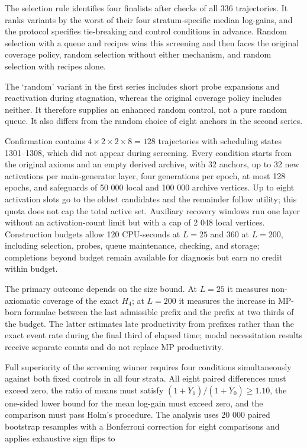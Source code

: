 \documentclass[pdflatex,sn-basic,Numbered]{sn-jnl}
\begin{document}
The selection rule identifies four finalists after checks of all 336 trajectories. It ranks variants by the worst of their four stratum-specific median log-gains, and the protocol specifies tie-breaking and control conditions in advance. Random selection with a queue and recipes wins this screening and then faces the original coverage policy, random selection without either mechanism, and random selection with recipes alone.

The `random' variant in the first series includes short probe expansions and reactivation during stagnation, whereas the original coverage policy includes neither. It therefore supplies an enhanced random control, not a pure random queue. It also differs from the random choice of eight anchors in the second series.

Confirmation contains \(4 \times 2 \times 2 \times 8 = 128\) trajectories with scheduling states 1301--1308, which did not appear during screening. Every condition starts from the original axioms and an empty derived archive, with 32 anchors, up to 32 new activations per main-generator layer, four generations per epoch, at most 128 epochs, and safeguards of 50 000 local and 100 000 archive vertices. Up to eight activation slots go to the oldest candidates and the remainder follow utility; this quota does not cap the total active set. Auxiliary recovery windows run one layer without an activation-count limit but with a cap of 2 048 local vertices. Construction budgets allow 120 CPU-seconds at \(L = 25\) and 360 at \(L = 200\), including selection, probes, queue maintenance, checking, and storage; completions beyond budget remain available for diagnosis but earn no credit within budget.

The primary outcome depends on the size bound. At \(L = 25\) it measures non-axiomatic coverage of the exact \(H_{4}\); at \(L = 200\) it measures the increase in MP-born formulae between the last admissible prefix and the prefix at two thirds of the budget. The latter estimates late productivity from prefixes rather than the exact event rate during the final third of elapsed time; modal necessitation results receive separate counts and do not replace MP productivity.

Full superiority of the screening winner requires four conditions simultaneously against both fixed controls in all four strata. All eight paired differences must exceed zero, the ratio of means must satisfy \((1 + {\overline{Y}}_{1})/(1 + {\overline{Y}}_{0}) \geq 1.10\), the one-sided lower bound for the mean log-gain must exceed zero, and the comparison must pass Holm's procedure. The analysis uses 20 000 paired bootstrap resamples with a Bonferroni correction for eight comparisons and applies exhaustive sign flips to
\end{document}
